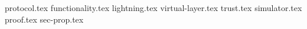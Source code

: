 \documentclass{llncs}
\begin{document}
\pagestyle{plain}
{protocol.tex}
{functionality.tex}
{lightning.tex}
{virtual-layer.tex}
{trust.tex}
{simulator.tex}
{proof.tex}
{sec-prop.tex}


\end{document}
